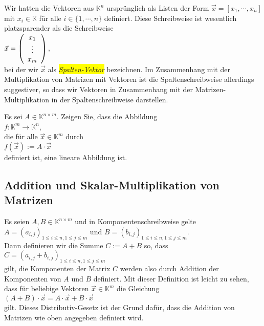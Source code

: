 \remark
Wir hatten die Vektoren aus $\mathbb{K}^n$ urspr\"{u}nglich als Listen der Form $\vec{x} = [x_1, \cdots, x_n]$ mit
$x_i \in \mathbb{K}$ f\"{u}r alle $i\in\{1,\cdots,n\}$ definiert.  Diese Schreibweise ist wesentlich
platzsparender als die Schreibweise
\\[0.2cm]
\hspace*{1.3cm}
$\vec{x} = \left(
      \begin{array}[c]{c}
      x_{1}  \\
      \vdots \\
      x_{m}  \\
      \end{array}
      \right),
$
\\[0.2cm]
bei der wir $\vec{x}$ als \colorbox{yellow}{\emph{Spalten-Vektor}} bezeichnen.  Im Zusammenhang mit der
Multiplikation von Matrizen mit Vektoren ist die Spaltenschreibweise allerdings 
suggestiver, so dass wir Vektoren in Zusammenhang mit der Matrizen-Multiplikation in der
Spaltenschreibweise darstellen.
\eoxs 
\pagebreak

\exercise
Es sei $A \in \mathbb{K}^{n \times m}$.  Zeigen Sie, dass die Abbildung
\\[0.2cm]
\hspace*{1.3cm}
$f: \mathbb{K} ^m \rightarrow \mathbb{K}^n$,
\\[0.2cm]
die f\"{u}r alle $\vec{x} \in \mathbb{K}^m$ durch
\\[0.2cm]
\hspace*{1.3cm}
$f(\vec{x}) := A \cdot \vec{x}$
\\[0.2cm]
definiert ist, eine lineare Abbildung ist.
\exend


\subsection{Addition und Skalar-Multiplikation von Matrizen}
Es seien $A,B \in \mathbb{K}^{n \times m}$ und in Komponentenschreibweise gelte 
\\[0.2cm]
\hspace*{1.3cm}
$A = (a_{i,j})_{1\leq i \leq n, 1 \leq j \leq m}$ \quad und \quad
$B = (b_{i,j})_{1\leq i \leq n, 1 \leq j \leq m}$.  
\\[0.2cm]
Dann definieren wir die Summe $C := A + B$ so, dass
\\[0.2cm]
\hspace*{1.3cm}
 $C = (a_{i,j} + b_{i,j})_{1\leq i \leq n, 1 \leq j \leq m}$ 
\\[0.2cm]
gilt, die Komponenten der
Matrix $C$ werden also durch Addition der Komponenten von $A$ und $B$  definiert.  Mit dieser
Definition ist leicht zu sehen, dass f\"{u}r beliebige Vektoren $\vec{x} \in \mathbb{K}^m$ die Gleichung
\\[0.2cm]
\hspace*{1.3cm}
$(A + B) \cdot \vec{x} = A \cdot \vec{x} + B \cdot \vec{x}$
\\[0.2cm]
gilt.  Dieses Distributiv-Gesetz ist der Grund daf\"{u}r, dass die Addition von Matrizen wie oben
angegeben definiert wird.


